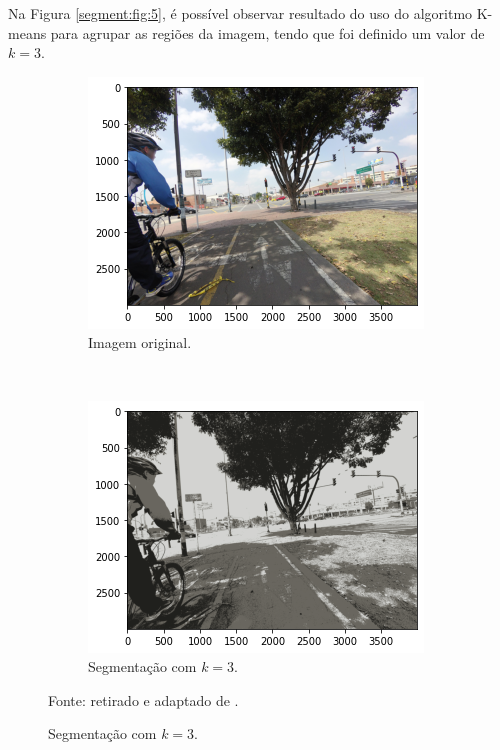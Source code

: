 Na Figura \ref{segment:fig:5}, é possível observar resultado do uso do algoritmo K-means para agrupar as regiões da imagem, tendo que foi definido um valor de $k = 3$.

\begin{figure}[H]
   \caption{Segmentação com K-means.}
   \centering
   \label{segment:fig:5}
    \begin{subfigure}[t]{0.45\textwidth}
        \centering
        \includegraphics[width=1\linewidth]{recursos/imagens/image_seg/i1.png}
        \caption{Imagem original.}
        \label{segment:fig:5.1}
    \end{subfigure}%
    ~ 
    \begin{subfigure}[t]{0.45\textwidth}
        \centering
        \includegraphics[width=1\linewidth]{recursos/imagens/image_seg/i2.png}
        \caption{Segmentação com $k = 3$.}
        \label{segment:fig:5.2}
    \end{subfigure}%

    Fonte: retirado e adaptado de \cite{Neuhold2017_ICCV}.
\end{figure}

